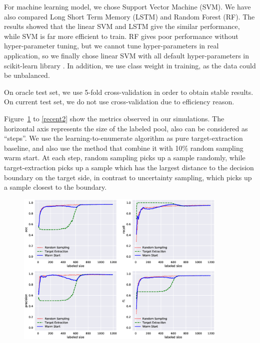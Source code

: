 \documentclass{deime}
\begin{document}
For machine learning model, we chose Support Vector Machine (SVM). We
have also compared Long Short Term Memory (LSTM) and Random Forest
(RF). The results showed that the linear SVM and LSTM give the similar
performance, while SVM is far more efficient to train. RF gives poor
performance without hyper-parameter tuning, but we cannot tune
hyper-parameters in real application, so we finally chose linear SVM
with all default hyper-parameters in scikit-learn library
\cite{sklearn}. In addition, we use class weight in training, as the
data could be unbalanced.

On oracle test set, we use 5-fold cross-validation in order to obtain
stable results.  On current test set, we do not use cross-validation
due to efficiency reason.

Figure~\ref{oracle1} to \ref{recent2} show the metrics observed in our
simulations.  The horizontal axis represents the size of the labeled
pool, also can be considered as ``steps''.  We use the
learning-to-enumerate algorithm \cite{enumerate} as pure
target-extraction baseline, and also use the method that combine it
with 10\% random sampling warm start.  At each step, random sampling
picks up a sample randomly, while target-extraction picks up a sample
which has the largest distance to the decision boundary on the target
side, in contrast to uncertainty sampling, which picks up a sample
closest to the boundary.

\begin{figure}[!t]
\centering
\includegraphics[width=0.9\textwidth]{resource/text_msg/oracle_k-fold5}
\label{oracle1}
\end{figure}
\end{document}

